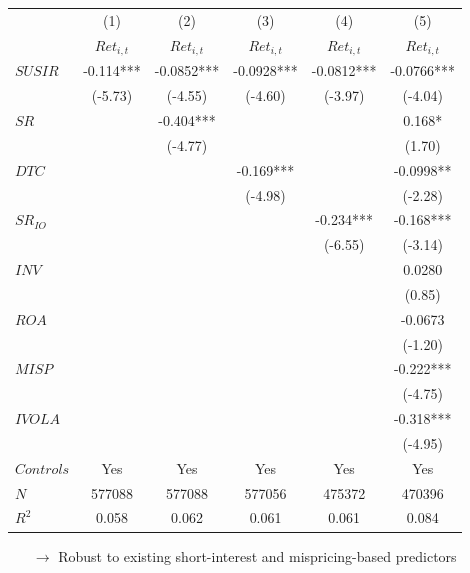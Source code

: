\documentclass{beamer}
\begin{document}
\begin{frame}
\begin{table}[htbp]
{    \begin{tabular}{lccccc}
    \toprule
          & (1)   & (2)   & (3)   & (4)   & (5) \\
            & $Ret_{i,t}$   & $Ret_{i,t}$   & $Ret_{i,t}$   & $Ret_{i,t}$   & $Ret_{i,t}$ \\
          \midrule
\rowcolor[rgb]{ .769,  .843,  .608}       $SUSIR$ & -0.114*** & -0.0852*** & -0.0928*** & -0.0812*** & -0.0766*** \\
\rowcolor[rgb]{ .769,  .843,  .608}             & (-5.73) & (-4.55) & (-4.60) & (-3.97) & (-4.04) \\
    $SR$  &       & -0.404*** &       &       & 0.168* \\
          &       & (-4.77) &       &       & (1.70) \\
    $DTC$ &       &       & -0.169*** &       & -0.0998** \\
          &       &       & (-4.98) &       & (-2.28) \\
    $SR_{IO}$ &       &       &       & -0.234*** & -0.168*** \\
          &       &       &       & (-6.55) & (-3.14) \\
    $INV$ &       &       &       &       & 0.0280 \\
          &       &       &       &       & (0.85) \\
    $ROA$ &       &       &       &       & -0.0673 \\
          &       &       &       &       & (-1.20) \\
    $MISP$ &       &       &       &       & -0.222*** \\
          &       &       &       &       & (-4.75) \\
    $IVOLA$ &       &       &       &       & -0.318*** \\
          &       &       &       &       & (-4.95) \\
          \midrule
	$Controls$ & Yes & Yes &Yes & Yes &Yes \\    
    $N$   & 577088 & 577088 & 577056 & 475372 & 470396 \\
    $R^2$ & 0.058 & 0.062 & 0.061 & 0.061 & 0.084 \\
    \bottomrule
    \end{tabular}%
	}
\end{table}
\begin{itemize}
\item[$\rightarrow$] Robust to existing short-interest and mispricing-based predictors
\end{itemize}

\end{frame}
\end{document}
